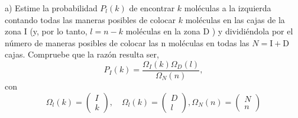 a) Estime la probabilidad $P_l(k)$ de encontrar $k$ moléculas a la izquierda contando todas las maneras posibles de colocar $k$ moléculas en las cajas de la zona I (y, por lo tanto, $l=n-k$ moléculas en la zona $\mathrm{D}$ ) y dividiéndola por el número de maneras posibles de colocar las n moléculas en todas las $N=\mathrm{I}+\mathrm{D}$ cajas. Compruebe que la razón resulta ser,
$$
P_I(k)=\frac{\Omega_I(k) \Omega_D(l)}{\Omega_N(n)},
$$
con
$$
\Omega_l(k)=\left(\begin{array}{l}
I \\
k
\end{array}\right), \quad \Omega_l(k)=\left(\begin{array}{l}
D \\
l
\end{array}\right), \Omega_N(n)=\left(\begin{array}{l}
N \\
n
\end{array}\right)
$$